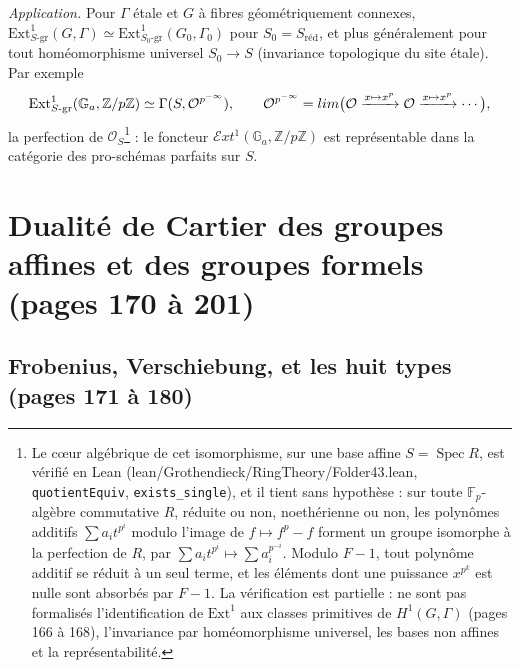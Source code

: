 \documentclass[11pt,a4paper]{article}
\begin{document}
\emph{Application.} Pour $\Gamma$ étale et $G$ à fibres géométriquement connexes,
$\mathrm{Ext}^1_{S\text{-gr}}(G, \Gamma) \simeq \mathrm{Ext}^1_{S_0\text{-gr}}(G_0,
\Gamma_0)$ pour $S_0 = S_{\text{réd}}$, et plus généralement pour tout
homéomorphisme universel $S_0 \to S$ (invariance topologique du site étale). Par
exemple
\[
\mathrm{Ext}^1_{S\text{-gr}}(\mathbb{G}_a, \mathbb{Z}/p\mathbb{Z}) \simeq \Gamma(S,
\mathcal{O}^{p^{-\infty}}),
\qquad
\mathcal{O}^{p^{-\infty}} = \varinjlim\bigl(\mathcal{O} \xrightarrow{x \mapsto x^p}
\mathcal{O} \xrightarrow{x \mapsto x^p} \cdots\bigr),
\]
la perfection de $\mathcal{O}_S$\footnote{Le cœur algébrique de cet
isomorphisme, sur une base affine $S = \operatorname{Spec} R$, est vérifié en
Lean (lean/Grothendieck/RingTheory/Folder43.lean, \texttt{quotientEquiv},
\texttt{exists\_single}), et il tient sans hypothèse : sur toute
$\mathbb{F}_p$-algèbre commutative $R$, réduite ou non, noethérienne ou non,
les polynômes additifs $\sum a_i t^{p^i}$ modulo l'image de
$f \mapsto f^p - f$ forment un groupe isomorphe à la perfection de $R$, par
$\sum a_i t^{p^i} \mapsto \sum a_i^{p^{-i}}$. Modulo $F - 1$, tout polynôme
additif se réduit à un seul terme, et les éléments dont une puissance
$x^{p^k}$ est nulle sont absorbés par $F - 1$. La vérification est partielle :
ne sont pas formalisés l'identification de $\mathrm{Ext}^1$ aux classes
primitives de $H^1(G, \Gamma)$ (pages 166 à 168), l'invariance par
homéomorphisme universel, les bases non affines et la représentabilité.} : le foncteur $\mathcal{E}xt^1(\mathbb{G}_a,
\mathbb{Z}/p\mathbb{Z})$ est représentable dans la catégorie des pro-schémas
parfaits sur $S$.

\section*{Dualité de Cartier des groupes affines et des groupes formels (pages 170 à 201)}

\subsection*{Frobenius, Verschiebung, et les huit types (pages 171 à 180)}
\end{document}
